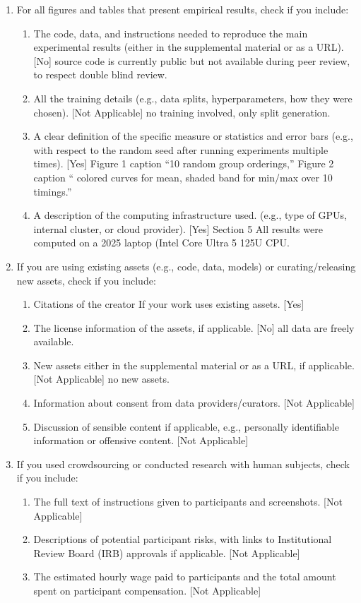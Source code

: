 \documentclass[twoside]{article}
\begin{document}
\begin{enumerate}
  \item For all figures and tables that present empirical results, check if you include:
  \begin{enumerate}
    \item The code, data, and instructions needed to reproduce the main experimental results (either in the supplemental material or as a URL). [No] source code is currently public but not available during peer review, to respect double blind review.
    \item All the training details (e.g., data splits, hyperparameters, how they were chosen). [Not Applicable] no training involved, only split generation.
    \item A clear definition of the specific measure or statistics and error bars (e.g., with respect to the random seed after running experiments multiple times). [Yes] Figure 1 caption ``10 random group orderings,'' Figure 2 caption `` colored curves for mean, shaded band for min/max over 10 timings.''
    \item A description of the computing infrastructure used. (e.g., type of GPUs, internal cluster, or cloud provider). [Yes] Section 5 All results were computed on a 2025 laptop (Intel Core Ultra 5 125U CPU.
  \end{enumerate}

  \item If you are using existing assets (e.g., code, data, models) or curating/releasing new assets, check if you include:
  \begin{enumerate}
    \item Citations of the creator If your work uses existing assets. [Yes]
    \item The license information of the assets, if applicable. [No] all data are freely available.
    \item New assets either in the supplemental material or as a URL, if applicable. [Not Applicable] no new assets.
    \item Information about consent from data providers/curators. [Not Applicable]
    \item Discussion of sensible content if applicable, e.g., personally identifiable information or offensive content. [Not Applicable]
  \end{enumerate}

  \item If you used crowdsourcing or conducted research with human subjects, check if you include:
  \begin{enumerate}
    \item The full text of instructions given to participants and screenshots. [Not Applicable]
    \item Descriptions of potential participant risks, with links to Institutional Review Board (IRB) approvals if applicable. [Not Applicable]
    \item The estimated hourly wage paid to participants and the total amount spent on participant compensation. [Not Applicable]
  \end{enumerate}

\end{enumerate}
\end{document}
